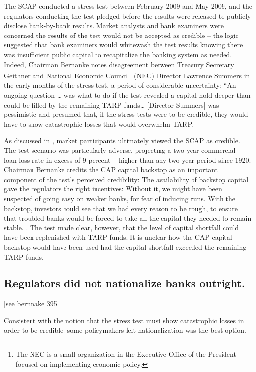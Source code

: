 \documentclass[12pt]{article}
\begin{document}
The SCAP conducted a stress test between February 2009 and May 2009, and the regulators conducting the test pledged before the results were released to publicly disclose bank-by-bank results. Market analysts and bank examiners were concerned the results of the test would not be accepted as credible -- the logic suggested that bank examiners would whitewash the test results knowing there was insufficient public capital to recapitalize the banking system as needed. Indeed, Chairman Bernanke notes disagreement between Treasury Secretary Geithner and National Economic Council\footnote{The NEC is a small organization in the Executive Office of the President focused on implementing economic policy.} (NEC) Director Lawrence Summers in the early months of the stress test, a period of considerable uncertainty: “An ongoing question … was what to do if the test revealed a capital hold deeper than could be filled by the remaining TARP funds… [Director Summers] was pessimistic and presumed that, if the stress tests were to be credible, they would have to show catastrophic losses that would overwhelm TARP.


As discussed in \citet{Rossa}, market participants ultimately viewed the SCAP as credible. The test scenario was particularly adverse, projecting a two-year commercial loan-loss rate in excess of 9 percent -- higher than any two-year period since 1920. Chairman Bernanke credits the CAP capital backstop as an important component of the test's perceived credibility:
The availability of backstop capital gave the regulators the right incentives: Without it, we might have been suspected of going easy on weaker banks, for fear of inducing runs. With the backstop, investors could see that we had every reason to be rough, to ensure that troubled banks would be forced to take all the capital they needed to remain stable. \citep{Bernanke}.
The test made clear, however, that the level of capital shortfall could have been replenished with TARP funds. It is unclear how the CAP capital backstop would have been used had the capital shortfall exceeded the remaining TARP funds.


\subsection{Regulators did not nationalize banks outright.}
[see bernnake 395]

Consistent with the notion that the stress test must show catastrophic losses in order to be credible, some policymakers felt nationalization was the best option.
\end{document}
